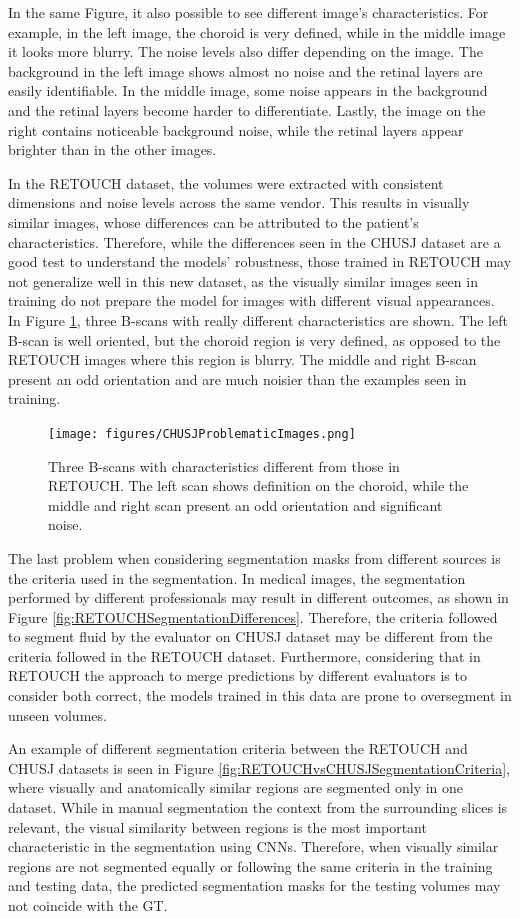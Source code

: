 In the same Figure, it also possible to see different image's characteristics. For example, in the left image, the choroid is very defined, while in the middle image it looks more blurry. The noise levels also differ depending on the image. The background in the left image shows almost no noise and the retinal layers are easily identifiable. In the middle image, some noise appears in the background and the retinal layers become harder to differentiate. Lastly, the image on the right contains noticeable background noise, while the retinal layers appear brighter than in the other images. 
\par
In the RETOUCH dataset, the volumes were extracted with consistent dimensions and noise levels across the same vendor. This results in visually similar images, whose differences can be attributed to the patient's characteristics. Therefore, while the differences seen in the CHUSJ dataset are a good test to understand the models' robustness, those trained in RETOUCH may not generalize well in this new dataset, as the visually similar images seen in training do not prepare the model for images with different visual appearances. In Figure \ref{fig:CHUSJProblematicImages}, three B-scans with really different characteristics are shown. The left B-scan is well oriented, but the choroid region is very defined, as opposed to the RETOUCH images where this region is blurry. The middle and right B-scan present an odd orientation and are much noisier than the examples seen in training.

\begin{figure}[!ht]
	\centering
	\texttt{[image: figures/CHUSJProblematicImages.png]}
	\caption{Three B-scans with characteristics different from those in RETOUCH. The left scan shows definition on the choroid, while the middle and right scan present an odd orientation and significant noise.}
	\label{fig:CHUSJProblematicImages}
\end{figure}

The last problem when considering segmentation masks from different sources is the criteria used in the segmentation. In medical images, the segmentation performed by different professionals may result in different outcomes, as shown in Figure \ref{fig:RETOUCHSegmentationDifferences}. Therefore, the criteria followed to segment fluid by the evaluator on CHUSJ dataset may be different from the criteria followed in the RETOUCH dataset. Furthermore, considering that in RETOUCH the approach to merge predictions by different evaluators is to consider both correct, the models trained in this data are prone to oversegment in unseen volumes.
\par
An example of different segmentation criteria between the RETOUCH and CHUSJ datasets is seen in Figure \ref{fig:RETOUCHvsCHUSJSegmentationCriteria}, where visually and anatomically similar regions are segmented only in one dataset. While in manual segmentation the context from the surrounding slices is relevant, the visual similarity between regions is the most important characteristic in the segmentation using CNNs. Therefore, when visually similar regions are not segmented equally or following the same criteria in the training and testing data, the predicted segmentation masks for the testing volumes may not coincide with the GT.

